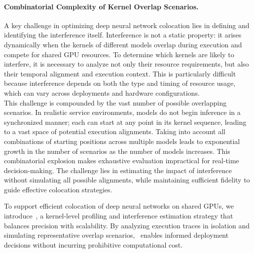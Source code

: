 \paragraph{Combinatorial Complexity of Kernel Overlap Scenarios.}
A key challenge in optimizing deep neural network colocation lies in defining and identifying the interference itself. Interference is not a static property: it arises dynamically when the kernels of different models overlap during execution and compete for shared GPU resources. To determine which kernels are likely to interfere, it is necessary to analyze not only their resource requirements, but also their temporal alignment and execution context. This is particularly difficult because interference depends on both the type and timing of resource usage, which can vary across deployments and hardware configurations.\\
This challenge is compounded by the vast number of possible overlapping scenarios. In realistic service environments, models do not begin inference in a synchronized manner; each can start at any point in its kernel sequence, leading to a vast space of potential execution alignments. Taking into account all combinations of starting positions across multiple models leads to exponential growth in the number of scenarios as the number of models increases. This combinatorial explosion makes exhaustive evaluation impractical for real-time decision-making. The challenge lies in estimating the impact of interference without simulating all possible alignments, while maintaining sufficient fidelity to guide effective colocation strategies.

To support efficient colocation of deep neural networks on shared GPUs, we introduce~\roomie, a kernel-level profiling and interference estimation strategy that balances precision with scalability. By analyzing execution traces in isolation and simulating representative overlap scenarios,~\roomie{} enables informed deployment decisions without incurring prohibitive computational cost.



